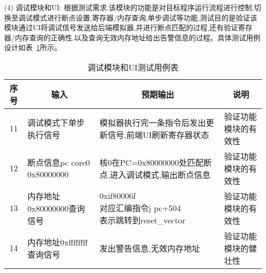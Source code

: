 (4) 调试模块和UI: 根据测试需求,该模块的功能是对目标程序运行流程进行控制,切换至调试模式进行断点设置,寄存器/内存查询,单步调试等功能,测试目的是验证该模块通过UI将调试信号发送给后端模拟器,并进行断点匹配的过程,还有验证寄存器/内存查询的正确性,以及查询无效内存地址给出告警信息的过程。具体测试用例设计如表~\ref{tab:test4}所示。
\begin{table}[h]
    \centering
    \caption{调试模块和UI测试用例表}
    \label{tab:test4}
    \begin{tabular}{clll}
      \toprule
      \multicolumn{1}{c}{序号} & \multicolumn{1}{c}{输入} & \multicolumn{1}{c}{预期输出} &\multicolumn{1}{c}{说明}\\
      \midrule
  11	& \multicolumn{1}{m{3cm}}{调试模式下单步执行信号} & \multicolumn{1}{m{4cm}}{模拟器执行完一条指令后发出更新信号,前端UI刷新寄存器状态} & \multicolumn{1}{m{3.5cm}}{验证功能模块的有效性}\\
  \hline
  12	& \multicolumn{1}{m{3cm}}{断点信息pc core0 0x80000000} & \multicolumn{1}{m{4cm}}{核0在PC=0x80000000处匹配断点,进入调试模式,输出断点信息} & \multicolumn{1}{m{3.5cm}}{验证功能模块的有效性}\\
  \hline
  13	& \multicolumn{1}{m{3cm}}{内存地址0x80000000查询信号} & \makecell[l]{0xif80006f\\
  对应汇编指令j pc+504\\
  表示跳转到reset\_vector
  } & \multicolumn{1}{m{3.5cm}}{验证功能模块的有效性}\\
  \hline
  14	& \multicolumn{1}{m{3cm}}{内存地址0xffffffff查询信号} & \multicolumn{1}{m{4cm}}{发出警告信息,无效内存地址} & \multicolumn{1}{m{3.5cm}}{验证功能模块的健壮性}\\
      \bottomrule
    \end{tabular}
\end{table}

